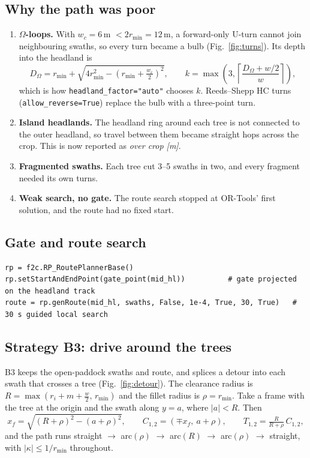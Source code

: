 \documentclass[11pt,a4paper]{article}
\newcommand{\code}[1]{\texttt{\small #1}}
\begin{document}
\subsection{Why the path was poor}
\begin{enumerate}[nosep]
  \item \textbf{$\Omega$-loops.} With $w_c=6$\,m $<2r_{\min}=12$\,m, a forward-only U-turn cannot join neighbouring swaths, so every turn became a
        bulb (Fig.~\ref{fig:turns}). Its depth into the headland is
        \begin{equation}
        D_\Omega=r_{\min}+\sqrt{4r_{\min}^2-\left(r_{\min}+\tfrac{w_c}{2}\right)^2},\qquad
        k=\max\!\left(3,\left\lceil\frac{D_\Omega+w/2}{w}\right\rceil\right),
        \end{equation}
        which is how \code{headland\_factor="auto"} chooses $k$. Reeds--Shepp HC turns (\code{allow\_reverse=True}) replace the bulb with a three-point turn.
  \item \textbf{Island headlands.} The headland ring around each tree is not connected to the outer headland, so travel between them became straight hops across the crop.
        This is now reported as \emph{over crop [m]}.
  \item \textbf{Fragmented swaths.} Each tree cut 3--5 swaths in two, and every fragment needed its own turns.
  \item \textbf{Weak search, no gate.} The route search stopped at OR-Tools' first solution, and the route had no fixed start.
\end{enumerate}

\subsection{Gate and route search}
\begin{lstlisting}
rp = f2c.RP_RoutePlannerBase()
rp.setStartAndEndPoint(gate_point(mid_hl))          # gate projected on the headland track
route = rp.genRoute(mid_hl, swaths, False, 1e-4, True, 30, True)   # 30 s guided local search
\end{lstlisting}

\subsection{Strategy B3: drive around the trees}
B3 keeps the open-paddock swaths and route, and splices a detour into each swath that crosses a tree (Fig.~\ref{fig:detour}).
The clearance radius is $R=\max(r_i+m+\tfrac w2,\,r_{\min})$ and the fillet radius is $\rho=r_{\min}$.
Take a frame with the tree at the origin and the swath along $y=a$, where $|a|<R$. Then
\begin{equation}
x_f=\sqrt{(R+\rho)^2-(a+\rho)^2},\qquad C_{1,2}=(\mp x_f,\ a+\rho),\qquad T_{1,2}=\tfrac{R}{R+\rho}\,C_{1,2},
\end{equation}
and the path runs straight $\to$ arc$(\rho)$ $\to$ arc$(R)$ $\to$ arc$(\rho)$ $\to$ straight, with $|\kappa|\le 1/r_{\min}$ throughout.
\end{document}
